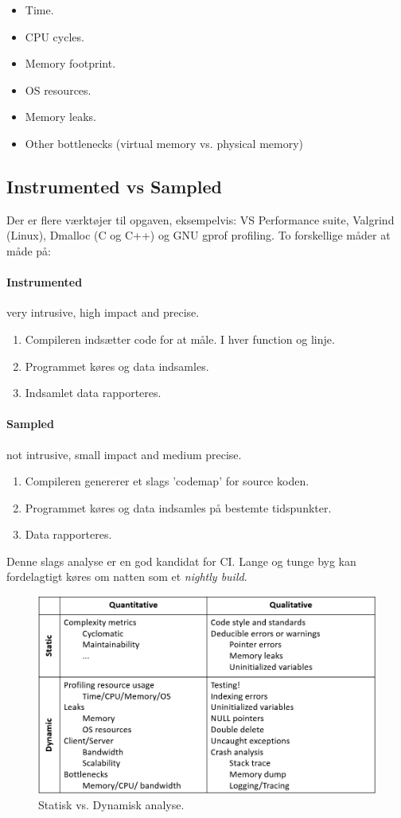 \begin{itemize}
	\item Time.
	\item CPU cycles.
	\item Memory footprint.
	\item OS resources.
	\item Memory leaks.
	\item Other bottlenecks (virtual memory vs. physical memory)
\end{itemize}

\subsection{Instrumented vs Sampled}
Der er flere værktøjer til opgaven, eksempelvis: VS Performance suite, Valgrind (Linux), Dmalloc (C og C++) og GNU gprof profiling. To forskellige måder at måde på:

\paragraph{Instrumented} very intrusive, high impact and precise.

\begin{enumerate}
	\item Compileren indsætter code for at måle. I hver function og linje.
	\item Programmet køres og data indsamles.
	\item Indsamlet data rapporteres.
\end{enumerate}

\paragraph{Sampled} not intrusive, small impact and medium precise.

\begin{enumerate}
	\item Compileren genererer et slags 'codemap' for source koden.
	\item Programmet køres og data indsamles på bestemte tidspunkter.
	\item Data rapporteres.
\end{enumerate}

Denne slags analyse er en god kandidat for CI. Lange og tunge byg kan fordelagtigt køres om natten som et \textit{nightly build}.

\begin{figure}[H]
\centering
\includegraphics[width=\linewidth]{figs/static_dynamic}
\caption{Statisk vs. Dynamisk analyse.}
\label{fig:staticdynamic}
\end{figure}






